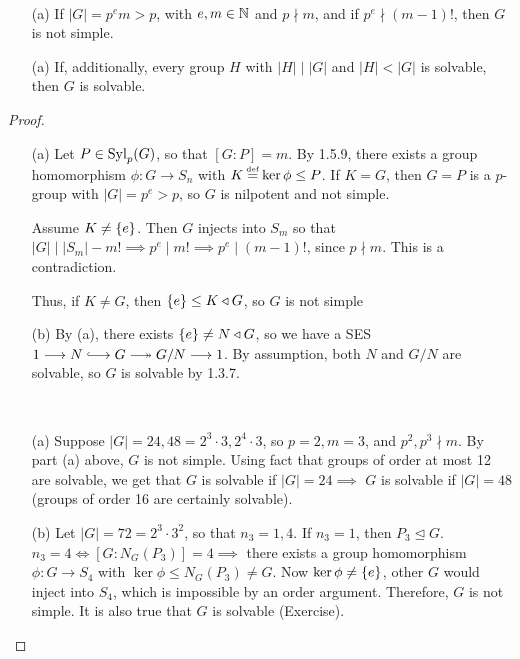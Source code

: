 \documentclass[11pt]{book}
\theoremstyle{definition}   \newtheorem{defn}[counter]{Definition} %
\newcommand{\nsg}{\mathrel{\unlhd}}   \newcommand{\ind}{\parindent24pt}   \newcommand{\vn}{\varnothing}
\newcommand\myeq{\mathrel{\overset{\makebox[0pt]{\mbox{\normalfont\tiny\sffamily \textrm{def}}}}{=}}}
\newcommand{\tl}{\triangleleft}   \newcommand{\sd}[1]{\rtimes_{#1}}   \newcommand{\x}{^{\times}}   \newcommand{\cyc}[1]{\begin{pmatrix} #1 \end{pmatrix}}
\newcommand{\hooklongrightarrow}{\lhook\joinrel\longrightarrow}   \newcommand{\twoheadlongrightarrow}{\relbar\joinrel\twoheadrightarrow}
\newcommand{\ses}[5]{1 \longrightarrow #1 \overset{#2}{\hooklongrightarrow} #3 \overset{#4}{\twoheadlongrightarrow} #5 \longrightarrow 1}
\DeclareMathOperator{\ra}{\rightarrow}   \DeclareMathOperator{\Poly}{\mathbf{P}}   \DeclareMathOperator{\spn}{\textnormal{span}}   \DeclareMathOperator{\aut}{\textnormal{Aut}}
\newcommand{\vs}{\vspace{8pt}}
\numberwithin{counter}{chapter}
\begin{document}
\vs

\begin{lemma}\
\begin{enumerate}
\item[(a)] If $|G| = p^e m > p$, with $e,m \in \operatorname{\mathbb{N}}$ and $p \nmid m$, and if $p^e \nmid (m-1)!$, then $G$ is not simple.
\item[(a)] If, additionally, every group $H$ with $|H| \mid |G|$ and $|H| < |G|$ is solvable, then $G$ is solvable.
\end{enumerate}
\end{lemma}

\vs

\begin{proof}
\
\begin{enumerate}
\item[(a)] Let $P \in \textnormal{Syl}_p(G)$, so that $[G : P] = m$. By 1.5.9, there exists a group homomorphism $\phi : G \ra S_n$ with $K \myeq \ker \phi \leq P$. If $K = G$, then $G = P$ is a $p$-group with $|G| = p^e > p$, so $G$ is nilpotent and not simple.

Assume $K \ne \{e\}$. Then $G$ injects into $S_m$ so that $|G| \mid |S_m| - m! \implies p^e \mid m! \implies p^e \mid (m-1)!$, since $p \nmid m$. This is a contradiction.

Thus, if $K \ne G$, then $\triv \leq K \tl G$, so $G$ is not simple

\item[(b)] By (a), there exists $\triv \ne N \tl G$, so we have a SES $\ses{N}{}{G}{}{G/N}$. By assumption, both $N$ and $G/N$ are solvable, so $G$ is solvable by 1.3.7.
\end{enumerate}

\vs

\begin{example}
\
\begin{enumerate}
\item[(a)] Suppose $|G| = 24,48 = 2^3 \cdot 3, 2^4 \cdot 3$, so $p = 2, m = 3$, and $p^2, p^3 \nmid m$. By part (a) above, $G$ is not simple. Using fact that groups of order at most 12 are solvable, we get that $G$ is solvable if $|G| = 24 \implies$ $G$ is solvable if $|G| = 48$ (groups of order 16 are certainly solvable).

\item[(b)] Let $|G| = 72 = 2^3 \cdot 3^2$, so that $n_3 = 1, 4$. If $n_3 = 1$, then $P_3 \nsg G$. $n_3 = 4 \iff [G : N_G(P_3)] = 4 \implies$ there exists a group homomorphism $\phi : G \ra S_4$ with $\ker \phi \leq N_G(P_3) \ne G$. Now $\ker \phi \ne \{e\}$, other $G$ would inject into $S_4$, which is impossible by an order argument. Therefore, $G$ is not simple. It is also true that $G$ is solvable (Exercise).


\end{enumerate}
\end{example}
\end{proof}
\end{document}
